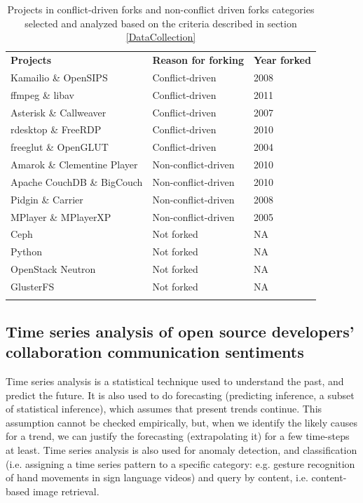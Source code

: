 \documentclass[12pt]{report}
\begin{document}
\begin{table}
\centering
\caption{Projects in conflict-driven forks and non-conflict driven forks categories selected and analyzed based on the criteria described in section \ref{DataCollection}}
\label{forkedProjectsDataCollected}
\begin{tabular}{p{} p{} p{}}
\hline\noalign{\smallskip}
\textbf{Projects} & \textbf{Reason for forking} & \textbf{Year forked}\\
\noalign{\smallskip}\hline\noalign{\smallskip}
Kamailio \& OpenSIPS & Conflict-driven & 2008 \\ \hline
ffmpeg \& libav & Conflict-driven & 2011 \\ \hline
Asterisk \& Callweaver & Conflict-driven & 2007 \\ \hline
rdesktop \& FreeRDP  & Conflict-driven & 2010 \\ \hline
freeglut \& OpenGLUT & Conflict-driven & 2004 \\ \hline
Amarok \& Clementine Player & Non-conflict-driven & 2010 \\ \hline
Apache CouchDB \& BigCouch & Non-conflict-driven & 2010 \\ \hline
Pidgin \& Carrier & Non-conflict-driven & 2008 \\ \hline
MPlayer \& MPlayerXP & Non-conflict-driven & 2005 \\ \hline
Ceph  & Not forked & NA \\ \hline
Python & Not forked & NA \\ \hline
OpenStack Neutron & Not forked & NA \\ \hline
GlusterFS & Not forked & NA \\ 
\noalign{\smallskip}\hline
\end{tabular}
\end{table}


\subsection{Time series analysis of open source developers’ collaboration communication sentiments}

Time series analysis is a statistical technique used to understand the past, and predict the future. It is also used to do forecasting (predicting inference, a subset of statistical inference), which assumes that present trends continue. This assumption cannot be
checked empirically, but, when we identify the likely causes for a trend, we can justify the forecasting (extrapolating it) for a few time-steps at least. Time series analysis is also used for anomaly detection, and classification (i.e. assigning a time series pattern to a specific category: e.g. gesture recognition of hand movements in sign language videos) and query by content, i.e. content-based image retrieval.
\end{document}
